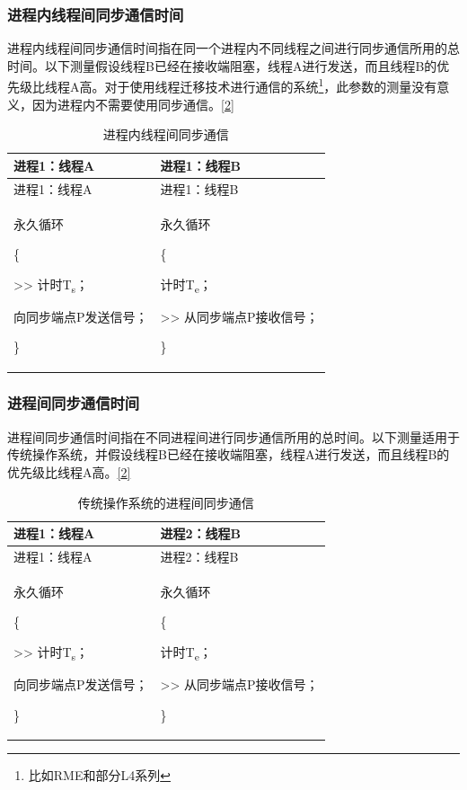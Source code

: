 \subsubsection{进程内线程间同步通信时间}\label{subsubsec:1-intra-process-sync-communication}

进程内线程间同步通信时间指在同一个进程内不同线程之间进行同步通信所用的总时间。以下测量假设线程B已经在接收端阻塞，线程A进行发送，而且线程B的优先级比线程A高。对于使用线程迁移技术进行通信的系统\footnote{比如RME和部分L4系列}，此参数的测量没有意义，因为进程内不需要使用同步通信。\hyperref[cite:1-2]{{[}2{]}}

\begin{xltabular}{\textwidth}{@{}>{\hsize\raggedright\arraybackslash}X>{\hsize\raggedright\arraybackslash}X@{}}
\caption{进程内线程间同步通信}\label{tab:1-5-intra-process-sync-communication}\\
\toprule
进程1：线程A & 进程1：线程B\tabularnewline
\endfirsthead
\toprule
进程1：线程A & 进程1：线程B\tabularnewline
\midrule
\endhead
\bottomrule
\endlastfoot
永久循环

\{

\textgreater\textgreater{} 计时T\textsubscript{s}；

向同步端点P发送信号；

\}\strut
 & 永久循环

\{

计时T\textsubscript{e}；

\textgreater\textgreater{} 从同步端点P接收信号；

\}\strut
\tabularnewline
\end{xltabular}

\subsubsection{进程间同步通信时间}\label{subsubsec:1-inter-process-sync-communication}

进程间同步通信时间指在不同进程间进行同步通信所用的总时间。以下测量适用于传统操作系统，并假设线程B已经在接收端阻塞，线程A进行发送，而且线程B的优先级比线程A高。\hyperref[cite:1-2]{{[}2{]}}

\begin{xltabular}{\textwidth}{@{}>{\hsize\raggedright\arraybackslash}X>{\hsize\raggedright\arraybackslash}X@{}}
\caption{传统操作系统的进程间同步通信}\label{tab:1-6-inter-process-sync-communication}\\
\toprule
进程1：线程A & 进程2：线程B\tabularnewline
\endfirsthead
\toprule
进程1：线程A & 进程2：线程B\tabularnewline
\midrule
\endhead
\bottomrule
\endlastfoot
永久循环

\{

\textgreater\textgreater{} 计时T\textsubscript{s}；

向同步端点P发送信号；

\}\strut
 & 永久循环

\{

计时T\textsubscript{e}；

\textgreater\textgreater{} 从同步端点P接收信号；

\}\strut
\tabularnewline
\end{xltabular}

